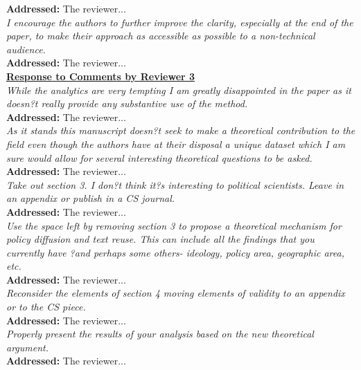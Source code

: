 \documentclass[12pt]{article}
\newcommand{\grey}[1]{{\color{mygrey}#1}}
\begin{document}
\noindent \textcolor{MyGreen}{\textbf{Addressed:}} The reviewer... \\

 \grey{\emph{ I encourage the authors to further improve the clarity, especially at the end of the paper, to make their approach as accessible as possible to a non-technical audience.}}\\

\noindent \textcolor{MyGreen}{\textbf{Addressed:}} The reviewer... \\


\noindent \underline{\textbf{Response to Comments by Reviewer 3}}\\

 \grey{\emph{ While the analytics are very tempting I am greatly disappointed in the paper as it doesn?t really provide any substantive use of the method.}}\\

\noindent \textcolor{MyGreen}{\textbf{Addressed:}} The reviewer... \\

 \grey{\emph{ As it stands this manuscript doesn?t seek to make a theoretical contribution to the field even though the authors have at their disposal a unique dataset which I am sure would allow for several interesting theoretical questions to be asked.}}\\

\noindent \textcolor{MyGreen}{\textbf{Addressed:}} The reviewer... \\

 \grey{\emph{ Take out section 3. I don?t think it?s interesting to political scientists. Leave in an appendix or publish in a CS journal.}}\\

\noindent \textcolor{MyGreen}{\textbf{Addressed:}} The reviewer... \\

 \grey{\emph{ Use the space left by removing section 3 to propose a theoretical mechanism for policy diffusion and text reuse. This can include all the findings that you currently have ?and perhaps some others- ideology, policy area, geographic area, etc.}}\\

\noindent \textcolor{MyGreen}{\textbf{Addressed:}} The reviewer... \\

 \grey{\emph{ Reconsider the elements of section 4 moving elements of validity to an appendix or to the CS piece.}}\\

\noindent \textcolor{MyGreen}{\textbf{Addressed:}} The reviewer... \\

 \grey{\emph{ Properly present the results of your analysis based on the new theoretical argument.}}\\

\noindent \textcolor{MyGreen}{\textbf{Addressed:}} The reviewer... 
\end{document}
